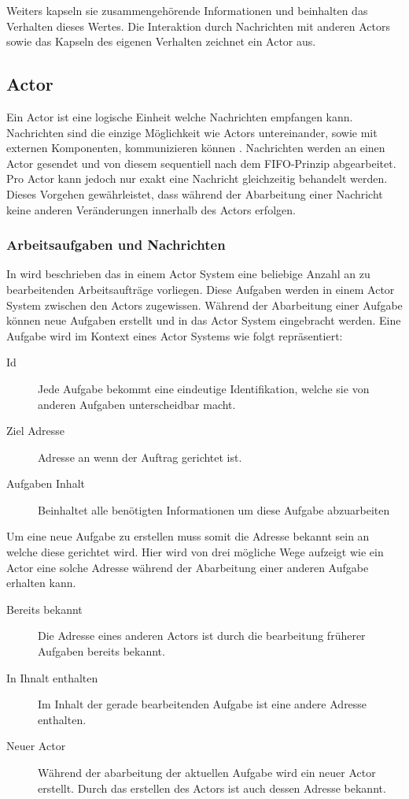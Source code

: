 Weiters kapseln sie zusammengehörende Informationen und beinhalten das Verhalten dieses Wertes. Die Interaktion durch Nachrichten mit anderen Actors sowie das Kapseln des eigenen Verhalten zeichnet ein Actor aus.

\subsection{Actor}
Ein Actor ist eine logische Einheit welche Nachrichten empfangen kann. Nachrichten sind die einzige Möglichkeit wie Actors untereinander, sowie mit externen Komponenten, kommunizieren können \citep{Agha1985ConcurrentParallelism}. Nachrichten werden an einen Actor gesendet und von diesem sequentiell nach dem {FIFO-Prinzip} abgearbeitet. 
Pro Actor kann jedoch nur exakt eine Nachricht gleichzeitig behandelt werden. Dieses Vorgehen gewährleistet, dass während der Abarbeitung einer Nachricht keine anderen Veränderungen innerhalb des Actors erfolgen.

\subsubsection{Arbeitsaufgaben und Nachrichten}
In \cite{Agha1985ActorsSystems} wird beschrieben das in einem Actor System eine beliebige Anzahl an zu bearbeitenden Arbeitsaufträge vorliegen. Diese Aufgaben werden in einem Actor System zwischen den Actors zugewissen. Während der Abarbeitung einer Aufgabe können neue Aufgaben erstellt und in das Actor System eingebracht werden. Eine Aufgabe wird im Kontext eines Actor Systems wie folgt repräsentiert:
\begin{description}
    \item[Id] Jede Aufgabe bekommt eine eindeutige Identifikation, welche sie von anderen Aufgaben unterscheidbar macht.
    \item[Ziel Adresse] Adresse an wenn der Auftrag gerichtet ist.
    \item[Aufgaben Inhalt] Beinhaltet alle benötigten Informationen um diese Aufgabe abzuarbeiten
\end{description} 
Um eine neue Aufgabe zu erstellen muss somit die Adresse bekannt sein an welche diese gerichtet wird. Hier wird von \cite{Agha1985ActorsSystems} drei mögliche Wege aufzeigt wie ein Actor eine solche Adresse während der Abarbeitung einer anderen Aufgabe erhalten kann.
\begin{description}
    \item[Bereits bekannt] Die Adresse eines anderen Actors ist durch die bearbeitung früherer Aufgaben bereits bekannt.
    \item[In Ihnalt enthalten] Im Inhalt der gerade bearbeitenden Aufgabe ist eine andere Adresse enthalten.
    \item[Neuer Actor] Während der abarbeitung der aktuellen Aufgabe wird ein neuer Actor erstellt. Durch das erstellen des Actors ist auch dessen Adresse bekannt.
\end{description}

